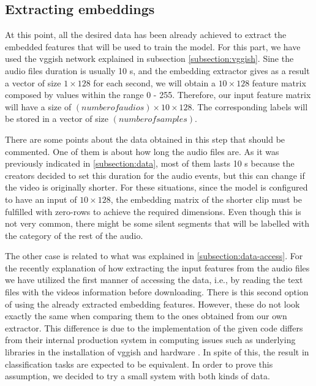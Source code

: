 \subsection{Extracting embeddings}
\label{subsection:extracting-embeddings}

	At this point, all the desired data has been already achieved to extract the embedded features that will be used to train the model. For this part, we have used the \acrshort{vgg}ish network explained in subsection \ref{subsection:vggish}. Sine the audio files duration is usually 10 s, and the embedding extractor gives as a result a vector of size $1 \times 128$ for each second, we will obtain a $10 \times 128$ feature matrix composed by values within the range 0 - 255. Therefore, our input feature matrix will have a size of $(number of audios) \times 10 \times 128$. The corresponding labels will be stored in a vector of size $(number of samples)$.
	
	There are some points about the data obtained in this step that should be commented. One of them is about how long the audio files are. As it was previously indicated in \ref{subsection:data}, most of them lasts 10 s because the creators decided to set this duration for the audio events, but this can change if the video is originally shorter. For these situations, since the model is configured to have an input of $10 \times 128$, the embedding matrix of the shorter clip must be fulfilled with zero-rows to achieve the required dimensions. Even though this is not very common, there might be some silent segments that will be labelled with the category of the rest of the audio. 
	
	The other case is related to what was explained in \ref{subsection:data-access}. For the recently explanation of how extracting the input features from the audio files we have utilized the first manner of accessing the data, i.e., by reading the text files with the videos information before downloading. There is this second option of using the already extracted embedding features. However, these do not look exactly the same when comparing them to the ones obtained from our own extractor. This difference is due to the implementation of the given code differs from their internal production system in computing issues such as underlying libraries in the installation of \acrshort{vgg}ish and hardware . In spite of this, the result in classification tasks are expected to be equivalent. In order to prove this assumption, we decided to try a small system with both kinds of data.
	
